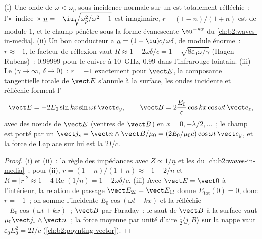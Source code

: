 \begin{proposition}\label{prop:b2:wave-interfaces:conductors}
(i) Une onde de $\omega < \omega_p$ sous incidence normale sur un  est totalement
réfléchie~: l'«~indice~» $\underline n = -\iu\sqrt{\omega_p^2/\omega^2 - 1}$ est imaginaire,
$r = (1 - \underline n)/(1 + \underline n)$ est de module $1$, et le champ pénètre
sous la forme évanescente $\eu^{-\kappa x}$ du \cref{ch:b2:waves-in-media}. (ii) Un
bon conducteur a $\underline n = (1 - \iu)c/\omega\delta$, de module énorme~: $r \approx
-1$, le facteur de réflexion vaut $R \approx 1 - 2\omega\delta/c = 1 - \sqrt{8\varepsilon_0\omega/\gamma}$
(Hagen--Rubens)~: $0.99999$ pour le cuivre à \qty{10}{GHz}, $0.99$ dans l'infrarouge
lointain. (iii) Le \emph{} ($\gamma \to \infty$, $\delta \to 0$)~:
$r = -1$ exactement pour $\vect E$, la composante tangentielle totale de $\vect E$ s'annule à
la surface, les ondes incidente et réfléchie forment l'
\[
\vect E = -2E_0\sin kx\sin\omega t\,\vect e_y , \qquad
\vect B = 2\frac{E_0}c\cos kx\cos\omega t\,\vect e_z ,
\]
avec des nœuds de $\vect E$ (ventres de $\vect B$) en $x = 0, -\lambda/2, \dots$~; le
champ est porté par un \emph{} $\vect j_s = \vect n\wedge\vect B/
\mu_0 = (2E_0/\mu_0c)\cos\omega t\,\vect e_y$, et la force de Laplace sur lui est
la  $2I/c$.
\end{proposition}

\begin{proof}
(i) et (ii)~: la règle des impédances avec $Z \propto 1/\underline n$ et les  du \cref{ch:b2:waves-in-media}~; pour (ii), $r = (1 - \underline n)/(1 +
\underline n) \approx -1 + 2/\underline n$ et $R = |r|^2 \approx 1 - 4\operatorname{Re}(1/
\underline n) = 1 - 2\omega\delta/c$. (iii) Avec $\vect E = \vect 0$ à l'intérieur, la
relation de passage $\vect E_{2t} = \vect E_{1t}$ donne $E_{\text{tot}}(0) = 0$, donc $r =
-1$~; on somme l'incidente $E_0\cos(\omega t - kx)$ et la réfléchie $-E_0\cos(\omega t + kx)$~;
$\vect B$ par Faraday~; le saut de $\vect B$ à la surface vaut $\mu_0\vect j_s
\wedge\vect n$~; la force moyenne par unité d'aire $\tfrac12\langle j_sB\rangle$ sur
la nappe vaut $\varepsilon_0E_0^2 = 2I/c$ (\cref{ch:b2:poynting-vector}).
\end{proof}

